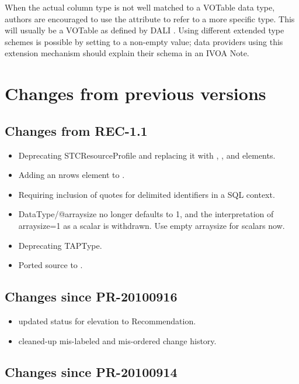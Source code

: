 \documentclass[11pt,a4paper]{ivoa}
\begin{document}
When the actual column type is not
well matched to a VOTable data type, authors are
encouraged to use the  attribute to refer to
a more specific type.  This will usually be a VOTable  as
defined by DALI \citep{2017ivoa.spec.0517D}.  Using different extended
type schemes is possible by setting  to a
non-empty value; data providers using this extension mechanism should
explain their schema in an IVOA Note.

\appendix

\section{Changes from previous versions}

\subsection{Changes from REC-1.1}

\begin{itemize}
\item Deprecating STCResourceProfile and replacing it with
, , and  elements.
\item Adding an nrows element to .
\item Requiring inclusion of quotes for delimited identifiers in a
SQL context.
\item DataType/@arraysize no longer defaults to 1, and the
interpretation of arraysize=1 as a scalar is withdrawn.  Use empty
arraysize for scalars now.
\item Deprecating TAPType.
\item Ported source to \ivoatex.
\end{itemize}

\subsection{Changes since PR-20100916}

\begin{itemize}
  \item updated status for elevation to Recommendation.
  \item cleaned-up mis-labeled and mis-ordered change history.
\end{itemize}

\subsection{Changes since PR-20100914}
\end{document}
